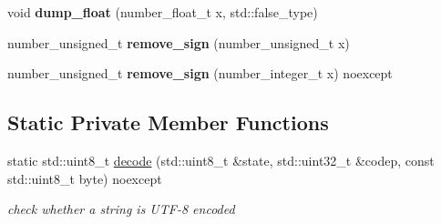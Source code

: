 \begin{DoxyCompactItemize}
void {\bfseries dump\+\_\+float} (number\+\_\+float\+\_\+t x, std\+::false\+\_\+type)
\item 
\mbox{\label{classnlohmann_1_1detail_1_1serializer_a45bcb8ea41e4db5461e979d4b1d5e5e7}} 
number\+\_\+unsigned\+\_\+t {\bfseries remove\+\_\+sign} (number\+\_\+unsigned\+\_\+t x)
\item 
\mbox{\label{classnlohmann_1_1detail_1_1serializer_aecc9c3f809a94a07010ea01d9c5a0c42}} 
number\+\_\+unsigned\+\_\+t {\bfseries remove\+\_\+sign} (number\+\_\+integer\+\_\+t x) noexcept
\end{DoxyCompactItemize}
\subsection*{Static Private Member Functions}
\begin{DoxyCompactItemize}
\item 
static std\+::uint8\+\_\+t \mbox{\hyperlink{classnlohmann_1_1detail_1_1serializer_abdcc4fd1dc5d3afb6c0817e4c89b1242}{decode}} (std\+::uint8\+\_\+t \&state, std\+::uint32\+\_\+t \&codep, const std\+::uint8\+\_\+t byte) noexcept
\begin{DoxyCompactList}\small\item\em check whether a string is U\+T\+F-\/8 encoded \end{DoxyCompactList}\end{DoxyCompactItemize}
